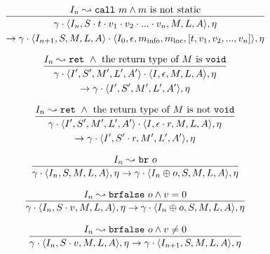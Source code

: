 \documentclass[declaration,shortabstract,english,mgr]{iithesis}
\newcommand{\mstate}[5] {
	\langle#1, #2, #3, #4, #5\rangle
}
\newcommand{\ipointsto}[3] {
	#1 \leadsto \texttt{#2} \text{ } #3
}
\begin{document}
\begin{equation}
\label{eq:semantics_call_not_static}
	\infer{
		\begin{gathered}
		\gamma \cdot \mstate{I_n}{S \cdot t \cdot v_1 \cdot v_2 \cdot ... \cdot v_n}{M}{L}{A}, \eta\\
			\rightarrow			
		\gamma \cdot \mstate{I_{n+1}}{S}{M}{L}{A} \cdot \mstate{I_0}{\epsilon}{m_{\text{info}}}{m_{\text{loc}}}{[t, v_1, v_2, ..., v_n]}, \eta
		\end{gathered}
	}
	{\ipointsto{I_n}{call}{m} \land m \text{ is not static}}
\end{equation}

\begin{equation}
\label{eq:semantics_ret_void}
	\infer{
		\begin{gathered}
		\gamma \cdot \mstate{I'}{S'}{M'}{L'}{A'} \cdot \mstate{I}{\epsilon}{M}{L}{A}, \eta\\
			\rightarrow			
		\gamma \cdot \mstate{I'}{S'}{M'}{L'}{A'}, \eta
		\end{gathered}
	}
	{\ipointsto{I_n}{ret} \land \text{ the return type of } M \text{ is \texttt{void}}}
\end{equation}

\begin{equation}
\label{eq:semantics_ret_not_void}
	\infer{
		\begin{gathered}
		\gamma \cdot \mstate{I'}{S'}{M'}{L'}{A'} \cdot \mstate{I}{\epsilon \cdot r}{M}{L}{A}, \eta\\
			\rightarrow			
		\gamma \cdot \mstate{I'}{S' \cdot r}{M'}{L'}{A'}, \eta
		\end{gathered}
	}
	{\ipointsto{I_n}{ret} \land \text{ the return type of } M \text{ is not \texttt{void}}}
\end{equation}

\begin{equation}
\label{eq:semantics_br}
	\infer{
		\gamma \cdot \mstate{I_n}{S}{M}{L}{A}, \eta
			\rightarrow
		\gamma \cdot \mstate{I_{n} \oplus o}{S}{M}{L}{A}, \eta
	}
	{\ipointsto{I_n}{br}{o}}
\end{equation}

\begin{equation}
\label{eq:semantics_brfalse1}
	\infer{
		\gamma \cdot \mstate{I_n}{S \cdot v}{M}{L}{A}, \eta
			\rightarrow
		\gamma \cdot \mstate{I_{n} \oplus o}{S}{M}{L}{A}, \eta
	}
	{\ipointsto{I_n}{brfalse}{o} \land v = 0}
\end{equation}

\begin{equation}
\label{eq:semantics_brfalse2}
	\infer{
		\gamma \cdot \mstate{I_n}{S \cdot v}{M}{L}{A}, \eta
			\rightarrow
		\gamma \cdot \mstate{I_{n+1}}{S}{M}{L}{A}, \eta
	}
	{\ipointsto{I_n}{brfalse}{o} \land v \neq 0}
\end{equation}
\end{document}
